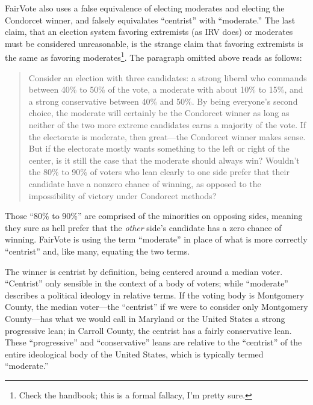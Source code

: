 FairVote also uses a false equivalence of electing moderates and electing the Condorcet winner, and falsely equivalates ``centrist'' with ``moderate.''  The last claim, that an election system favoring extremists (as IRV does) or moderates must be considered unreasonable, is the strange claim that favoring extremists is the same as favoring moderates\footnote{Check the handbook; this is a formal fallacy, I'm pretty sure.}.  The paragraph omitted above reads as follows:

\begin{quotation}
    Consider an election with three candidates: a strong liberal who commands between 40\% to 50\% of the vote, a moderate with about 10\% to 15\%, and a strong conservative between 40\% and 50\%. By being everyone’s second choice, the moderate will certainly be the Condorcet winner as long as neither of the two more extreme candidates earns a majority of the vote. If the electorate is moderate, then great—the Condorcet winner makes sense. But if the electorate mostly wants something to the left or right of the center, is it still the case that the moderate should always win? Wouldn’t the 80\% to 90\% of voters who lean clearly to one side prefer that their candidate have a nonzero chance of winning, as opposed to the impossibility of victory under Condorcet methods?
\end{quotation}

Those ``80\% to 90\%'' are comprised of the minorities on opposing sides, meaning they sure as hell prefer that the \textit{other} side's candidate has a zero chance of winning.  FairVote is using the term ``moderate'' in place of what is more correctly ``centrist'' and, like many, equating the two terms.

The winner is centrist by definition, being centered around a median voter.  ``Centrist'' only sensible in the context of a body of voters; while ``moderate'' describes a political ideology in relative terms.  If the voting body is Montgomery County, the median voter—the ``centrist'' if we were to consider only Montgomery County—has what we would call in Maryland or the United States a strong progressive lean; in Carroll County, the centrist has a fairly conservative lean.  These ``progressive'' and ``conservative'' leans are relative to the ``centrist'' of the entire ideological body of the United States, which is typically termed ``moderate.''


